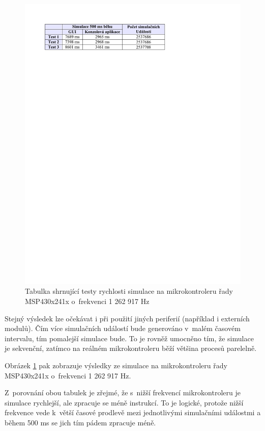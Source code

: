 \begin{figure}[ht]
\centering
\includegraphics[trim=0cm 23.5cm 2cm 2cm]{fig/tabulka2}
\caption{Tabulka shrnující testy rychlosti simulace na mikrokontroleru řady MSP430x241x o~frekvenci 1 262 917 Hz}
\label{fig:tabulka2}
\end{figure}

Stejný výsledek lze očekávat i při použití jiných periferií (například i externích modulů). Čím více simulačních událostí bude generováno v~malém časovém intervalu, tím pomalejší simulace bude. To je rovněž umocněno tím, že simulace je sekvenční, zatímco na reálném mikrokontroleru běží většina procesů parelelně.

Obrázek \ref{fig:tabulka2} pak zobrazuje výsledky ze simulace na mikrokontroleru řady MSP430x241x o~frekvenci 1 262 917 Hz.

Z~porovnání obou tabulek je zřejmé, že s~nižší frekvencí mikrokontroleru je simulace rychlejší, ale zpracuje se méně instrukcí. To je logické, protože nižší frekvence vede k~větší časové prodlevě mezi jednotlivými simulačními událostmi a během 500 ms se jich tím pádem zpracuje méně.

